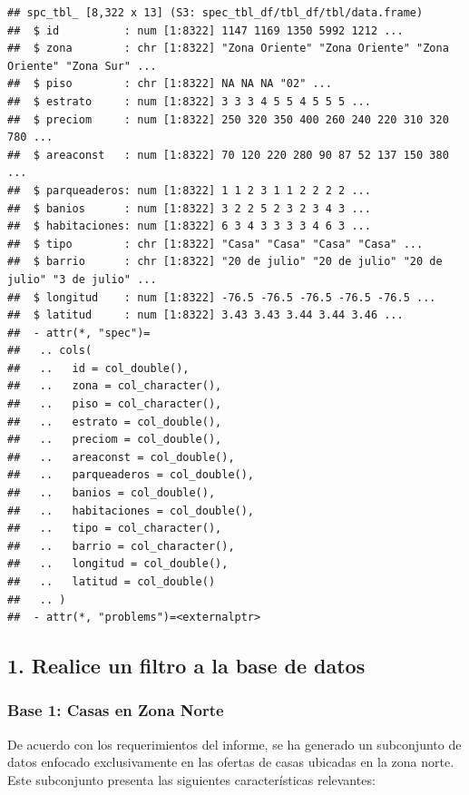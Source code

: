 \documentclass[
]{article}
\begin{document}
\begin{verbatim}
## spc_tbl_ [8,322 x 13] (S3: spec_tbl_df/tbl_df/tbl/data.frame)
##  $ id          : num [1:8322] 1147 1169 1350 5992 1212 ...
##  $ zona        : chr [1:8322] "Zona Oriente" "Zona Oriente" "Zona Oriente" "Zona Sur" ...
##  $ piso        : chr [1:8322] NA NA NA "02" ...
##  $ estrato     : num [1:8322] 3 3 3 4 5 5 4 5 5 5 ...
##  $ preciom     : num [1:8322] 250 320 350 400 260 240 220 310 320 780 ...
##  $ areaconst   : num [1:8322] 70 120 220 280 90 87 52 137 150 380 ...
##  $ parqueaderos: num [1:8322] 1 1 2 3 1 1 2 2 2 2 ...
##  $ banios      : num [1:8322] 3 2 2 5 2 3 2 3 4 3 ...
##  $ habitaciones: num [1:8322] 6 3 4 3 3 3 3 4 6 3 ...
##  $ tipo        : chr [1:8322] "Casa" "Casa" "Casa" "Casa" ...
##  $ barrio      : chr [1:8322] "20 de julio" "20 de julio" "20 de julio" "3 de julio" ...
##  $ longitud    : num [1:8322] -76.5 -76.5 -76.5 -76.5 -76.5 ...
##  $ latitud     : num [1:8322] 3.43 3.43 3.44 3.44 3.46 ...
##  - attr(*, "spec")=
##   .. cols(
##   ..   id = col_double(),
##   ..   zona = col_character(),
##   ..   piso = col_character(),
##   ..   estrato = col_double(),
##   ..   preciom = col_double(),
##   ..   areaconst = col_double(),
##   ..   parqueaderos = col_double(),
##   ..   banios = col_double(),
##   ..   habitaciones = col_double(),
##   ..   tipo = col_character(),
##   ..   barrio = col_character(),
##   ..   longitud = col_double(),
##   ..   latitud = col_double()
##   .. )
##  - attr(*, "problems")=<externalptr>
\end{verbatim}

\subsection{\texorpdfstring{\textbf{1. Realice un filtro a la base de
datos
}}{1. Realice un filtro a la base de datos }}\label{realice-un-filtro-a-la-base-de-datos}

\subsubsection{\texorpdfstring{\textbf{Base 1: Casas en Zona
Norte}}{Base 1: Casas en Zona Norte}}\label{base-1-casas-en-zona-norte}

De acuerdo con los requerimientos del informe, se ha generado un
subconjunto de datos enfocado exclusivamente en las ofertas de casas
ubicadas en la zona norte. Este subconjunto presenta las siguientes
características relevantes:
\end{document}
